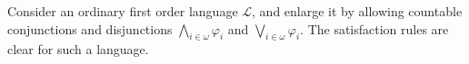 Consider an ordinary first order language $\mathcal{L}$, and enlarge it by allowing countable conjunctions and disjunctions $\bigwedge_{i \in \omega} \varphi_i$ and $\bigvee_{i \in \omega} \varphi_i$. The satisfaction rules are clear for such a language.

